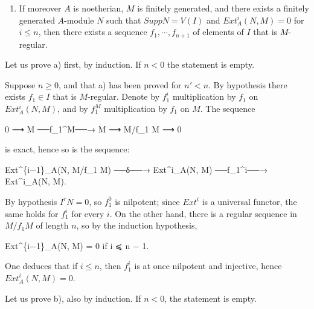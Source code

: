 \documentclass[
  11pt,
  a4paper,
]{book}
\newenvironment{Shaded}{}{}
\newcommand{\NormalTok}[1]{#1}
\providecommand{\tightlist}{%
  \setlength{\itemsep}{0pt}\setlength{\parskip}{0pt}}
\begin{document}
\begin{enumerate}
\def\labelenumi{\alph{enumi})}
\setcounter{enumi}{1}
\tightlist
\item
  If moreover \(A\) is noetherian, \(M\) is finitely generated, and
  there exists a finitely generated \(A\)-module \(N\) such that
  \(Supp N = V(I)\) and \(Ext^{i}_{A}(N, M) = 0\) for \(i \leqslant n\),
  then there exists a sequence \(f_{1}, \cdots,
  f_{n+1}\) of elements of \(I\) that is \(M\)-regular.
\end{enumerate}

Let us prove a) first, by induction. If \(n < 0\) the statement is
empty.

Suppose \(n \geqslant 0\), and that a) has been proved for \(n' < n\).
By hypothesis there exists \(f_{1} \in I\) that is \(M\)-regular. Denote
by \(f^{i}_{1}\) multiplication by \(f_{1}\) on \(Ext^{i}_{A}(N, M)\),
and by \(f^{M}_{1}\) multiplication by \(f_{1}\) on \(M\). The sequence

\begin{Shaded}
\begin{Highlighting}[]
\NormalTok{0 ⟶ M ──f\_1\^{}M──→ M ⟶ M/f\_1 M ⟶ 0}
\end{Highlighting}
\end{Shaded}

is exact, hence so is the sequence:

\begin{Shaded}
\begin{Highlighting}[]
\NormalTok{Ext\^{}\{i−1\}\_A(N, M/f\_1 M) ──δ──→ Ext\^{}i\_A(N, M) ──f\_1\^{}i──→ Ext\^{}i\_A(N, M).}
\end{Highlighting}
\end{Shaded}

By hypothesis \(I^{r} N = 0\), so \(f^{0}_{1}\) is nilpotent; since
\(Ext^{i}\) is a universal functor, the same holds for \(f^{i}_{1}\) for
every \(i\). On the other hand, there is a regular sequence in
\(M/f_{1} M\) of length \(n\), so by the induction hypothesis,

\begin{Shaded}
\begin{Highlighting}[]
\NormalTok{Ext\^{}\{i−1\}\_A(N, M) = 0 if i ⩽ n − 1.}
\end{Highlighting}
\end{Shaded}

One deduces that if \(i \leqslant n\), then \(f^{i}_{1}\) is at once
nilpotent and injective, hence \(Ext^{i}_{A}(N, M) = 0\).

Let us prove b), also by induction. If \(n < 0\), the statement is
empty.
\end{document}
